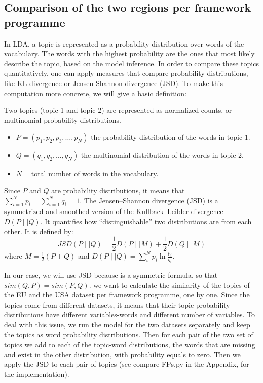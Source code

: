 \documentclass[12pt]{report}
\begin{document}
\subsection{Comparison of the two regions per framework programme}

In LDA, a topic is represented as a probability distribution over words of the
vocabulary. The words with the highest probability are the ones that most likely
describe the topic, based on the model inference. In order to compare these
topics quantitatively, one can apply measures that compare probability
distributions, like KL-divergence or Jensen Shannon divergence (JSD). To make
this computation more concrete, we will give a basic definition:

Two topics (topic 1 and topic 2) are represented as normalized counts, or
multinomial probability distributions.
\begin{itemize}
\item $P=(p_1, p_2, p_3,…, p_N)$ the probability distribution of the words in topic 1.
\item $Q=(q_1, q_2, …, q_N)$ the multinomial distribution of the words in topic 2.
\item $N = $total number of words in the vocabulary.
\end{itemize}

Since $P$ and $Q$ are probability distributions, it means that 
$\sum_{i=1}^{N} p_i = \sum_{i=1}^{N} q_i = 1$. The Jensen–Shannon 
divergence (JSD) is a
symmetrized and smoothed version of the Kullback–Leibler divergence
$D(P \mid\mid Q)$. It quantifies how ``distinguishable'' two distributions are
from each other. It is defined by:
\begin{equation}
JSD(P \mid\mid Q) = \frac{1}{2}D(P \mid\mid M) + \frac{1}{2}D(Q \mid\mid M)
\end{equation}
where $M = \frac{1}{2}(P + Q)$ and $D(P \mid\mid Q) = \sum_{i}^{N} p_i \ln\frac{p_i}{q_i}$.

In our case, we will use JSD because is a symmetric
formula, so that $sim(Q,P) = sim(P,Q)$. we want to calculate the
similarity of the topics of the EU and the USA dataset per framework
programme, one by one. Since the topics come from different datasets,
it means that their topic probability distributions have different
variables-words and different number of variables. To deal with this
issue, we run the model for the two datasets separately and keep the
topics as word probability distributions. Then for each pair of the
two set of topics we add to each of the topic-word distributions, the
words that are missing and exist in the other distribution, with
probability equals to zero. Then we apply the JSD to each pair of
topics (see compare FPs.py in the Appendix, for the implementation).
\end{document}
